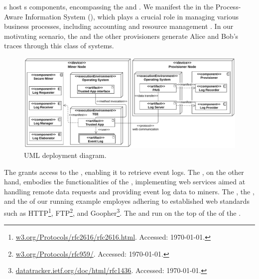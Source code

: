 s host s components, encompassing the  and . 
We manifest the  in the Process-Aware Information System (), which plays a crucial role in managing various business processes, including accounting and resource management \cite{Dumas.etal/2018:FundamentalsofBPM}. In our motivating scenario, the  and the other provisioners generate Alice and Bob's traces through this class of systems.
\begin{figure}[t]
	\centering
	\includegraphics[width=1\linewidth]{content/figures/deploymentdiagram3.pdf}
	\caption{UML deployment diagram.}
	\label{fig:deployment_diagram}
\end{figure}
The  grants access to the , enabling it to retrieve event logs. The , on the other hand, embodies the functionalities of the , implementing web services aimed at handling remote data requests and providing event log data to miners. The , the , and the  of our running example employes  adhering to established web standards such as HTTP\footnote{\url{w3.org/Protocols/rfc2616/rfc2616.html}. Accessed: \today.}, FTP\footnote{\url{w3.org/Protocols/rfc959/}. Accessed: \today.}, and Goopher\footnote{\url{datatracker.ietf.org/doc/html/rfc1436}. Accessed: \today.}. The  and  run on the top of the  of the .

